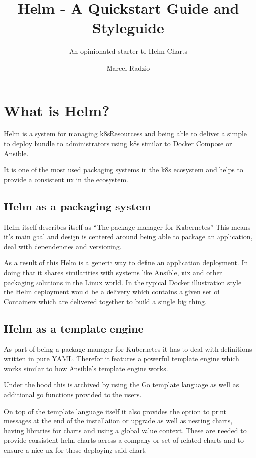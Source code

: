 \documentclass[english,10pt]{scrbook}
\title{Helm - A Quickstart Guide and Styleguide}
\subtitle{An opinionated starter to Helm Charts}
\author{Marcel Radzio}
\begin{document}
\maketitle
\tableofcontents

\chapter{What is Helm?}
Helm is a system for managing \Glspl{k8sResources} and being able to deliver a simple to deploy bundle to administrators using \Gls{k8s} similar to Docker Compose or Ansible.

It is one of the most used packaging systems in the \Gls{k8s} ecosystem and helps to provide a consistent \gls{ux} in the ecosystem.

\section{Helm as a packaging system}
Helm itself describes itself as \enquote{The package manager for Kubernetes}\cite{helmauthorsHelm}
This means it's main goal and design is centered around being able to package an application, deal with dependencies and versioning.

As a result of this Helm is a generic way to define an application deployment.
In doing that it shares similarities with systems like Ansible, nix and other packaging solutions in the Linux world. 
In the typical Docker illustration style the Helm deployment would be a delivery which contains a given set of Containers which are delivered together to build a single big thing.

\section{Helm as a template engine}
As part of being a package manager for Kubernetes it has to deal with definitions written in pure YAML.
Therefor it features a powerful template engine which works similar to how Ansible's template engine works.

Under the hood this is archived by using the Go template language\cite{helmauthorsTemplateFunctionsPipelines,thegoauthorsTemplatePackageText} as well as additional go functions provided to the users.

On top of the template language itself it also provides the option to print messages at the end of the installation or upgrade as  well as nesting charts, having libraries for charts and using a global value context.
These are needed to provide consistent helm charts across a company or set of related charts and to ensure a nice \gls{ux} for those deploying said chart.
\end{document}
